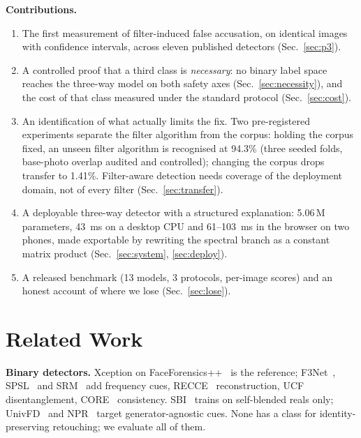 \documentclass[conference]{IEEEtran}
\begin{document}
\textbf{Contributions.}
\begin{enumerate}
\item The first measurement of filter-induced false accusation, on identical images with
      confidence intervals, across eleven published detectors (Sec.~\ref{sec:p3}).
\item A controlled proof that a third class is \emph{necessary}: no binary label space
      reaches the three-way model on both safety axes (Sec.~\ref{sec:necessity}), and the cost
      of that class measured under the standard protocol (Sec.~\ref{sec:cost}).
\item An identification of what actually limits the fix. Two pre-registered experiments
      separate the filter algorithm from the corpus: holding the corpus fixed, an unseen
      filter algorithm is recognised at 94.3\% (three seeded folds, base-photo overlap
      audited and controlled); changing the corpus drops transfer to 1.41\%. Filter-aware
      detection needs coverage of the deployment domain, not of every filter
      (Sec.~\ref{sec:transfer}).
\item A deployable three-way detector with a structured explanation: 5.06\,M parameters,
      \SI{43}{\milli\second} on a desktop CPU and \SI{61}{}--\SI{103}{\milli\second} in the
      browser on two phones, made exportable by rewriting the spectral branch as a constant
      matrix product (Sec.~\ref{sec:system}, \ref{sec:deploy}).
\item A released benchmark (13 models, 3 protocols, per-image scores) and an honest account of
      where we lose (Sec.~\ref{sec:lose}).
\end{enumerate}

\section{Related Work}
\textbf{Binary detectors.} Xception on FaceForensics++~\cite{rossler2019} is the reference;
F3Net~\cite{qian2020}, SPSL~\cite{liu2021} and SRM~\cite{luo2021} add frequency cues,
RECCE~\cite{cao2022} reconstruction, UCF~\cite{yan2023ucf} disentanglement,
CORE~\cite{ni2022} consistency. SBI~\cite{shiohara2022} trains on self-blended reals only;
UnivFD~\cite{ojha2023} and NPR~\cite{tan2024} target generator-agnostic cues. None has a
class for identity-preserving retouching; we evaluate all of them.
\end{document}
